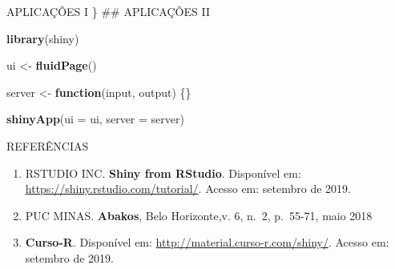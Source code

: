 \documentclass[
  ignorenonframetext,
]{beamer}
\newenvironment{Shaded}{\begin{snugshade}}{\end{snugshade}}
\newcommand{\ControlFlowTok}[1]{\textcolor[rgb]{0.13,0.29,0.53}{\textbf{#1}}}
\newcommand{\DataTypeTok}[1]{\textcolor[rgb]{0.13,0.29,0.53}{#1}}
\newcommand{\KeywordTok}[1]{\textcolor[rgb]{0.13,0.29,0.53}{\textbf{#1}}}
\newcommand{\NormalTok}[1]{#1}
\newcommand{\StringTok}[1]{\textcolor[rgb]{0.31,0.60,0.02}{#1}}
\providecommand{\tightlist}{%
  \setlength{\itemsep}{0pt}\setlength{\parskip}{0pt}}
\begin{document}
\begin{frame}[fragile]{APLICAÇÕES I}
\} \#\# APLICAÇÕES II

\begin{Shaded}
\begin{Highlighting}[]
\KeywordTok{library}\NormalTok{(shiny)}

\NormalTok{ui <-}\StringTok{ }\KeywordTok{fluidPage}\NormalTok{()}

\NormalTok{server <-}\StringTok{ }\ControlFlowTok{function}\NormalTok{(input, output) \{\}}

\KeywordTok{shinyApp}\NormalTok{(}\DataTypeTok{ui =}\NormalTok{ ui, }\DataTypeTok{server =}\NormalTok{ server)}
\end{Highlighting}
\end{Shaded}

\end{frame}

\begin{frame}{REFERÊNCIAS}
\protect\hypertarget{referencias}{}

\begin{enumerate}
\tightlist
\item
  RSTUDIO INC. \textbf{Shiny from RStudio}. Disponível em:
  \url{https://shiny.rstudio.com/tutorial/}. Acesso em: setembro de
  2019.
\item
  PUC MINAS. \textbf{Abakos}, Belo Horizonte,v. 6, n.~2, p.~55-71, maio
  2018
\item
  \textbf{Curso-R}. Disponível em:
  \url{http://material.curso-r.com/shiny/}. Acesso em: setembro de 2019.
\end{enumerate}

\end{frame}
\end{document}
